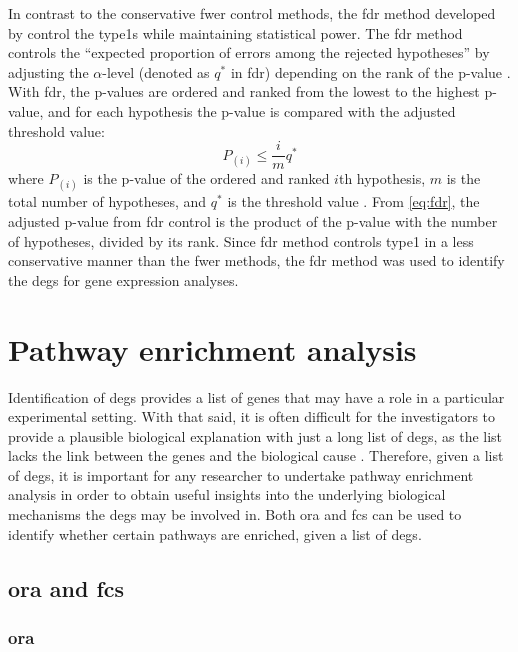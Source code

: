 In contrast to the conservative \gls{fwer} control methods, the \gls{fdr} method developed by \citet{Benjamini1995a} control the \glspl{type1} while maintaining statistical \gls{power}.
The \gls{fdr} method controls the ``expected proportion of errors among the rejected hypotheses'' by adjusting the $\alpha$-level (denoted as $q^*$ in \gls{fdr}) depending on the rank of the p-value \citep{Benjamini1995a}.
With \gls{fdr}, the p-values are ordered and ranked from the lowest to the highest p-value, and for each hypothesis the p-value is compared with the adjusted threshold value:
\begin{equation}
	\label{eq:fdr}
	P_{(i)} \leq \frac{i}{m}q^*
\end{equation}
where $P_{(i)}$ is the p-value of the ordered and ranked $i$th hypothesis, $m$ is the total number of hypotheses, and $q^*$ is the threshold value \citep{Benjamini1995a}.
From \cref{eq:fdr}, the adjusted p-value from \gls{fdr} control is the product of the p-value with the number of hypotheses, divided by its rank.
Since \gls{fdr} method controls \gls{type1} in a less conservative manner than the \gls{fwer} methods, the \gls{fdr} method was used to identify the \glspl{deg} for gene expression analyses.

\section{Pathway enrichment analysis}
\label{sec:pathway_enrichment_analysis}

Identification of \glspl{deg} provides a list of genes that may have a role in a particular experimental setting.
With that said, it is often difficult for the investigators to provide a plausible biological explanation with just a long list of \glspl{deg}, as the list lacks the link between the genes and the biological cause \citep{Khatri2012}.
Therefore, given a list of \glspl{deg}, it is important for any researcher to undertake pathway enrichment analysis in order to obtain useful insights into the underlying biological mechanisms the \glspl{deg} may be involved in.
Both \acrfull{ora} and \acrfull{fcs} can be used to identify whether certain pathways are enriched, given a list of \glspl{deg}.

\subsection{\Gls{ora} and \gls{fcs}}
\label{sub:ora_and_fcs}

\subsubsection{\Gls{ora}}
\label{ssub:ora}

